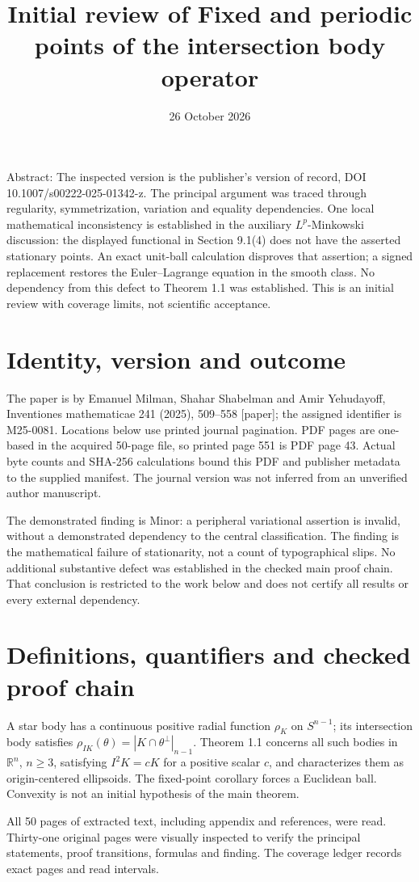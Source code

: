 \documentclass[10pt]{article}
\title{Initial review of
Fixed and periodic points of the intersection body operator}
\author{}
\date{26 October 2026}
\begin{document}
\maketitle
Abstract: The inspected version is the publisher’s version of record, DOI 10.1007/s00222-025-01342-z. The principal argument was traced through regularity, symmetrization, variation and equality dependencies. One local mathematical inconsistency is established in the auxiliary \(L^p\)-Minkowski discussion: the displayed functional in Section 9.1(4) does not have the asserted stationary points. An exact unit-ball calculation disproves that assertion; a signed replacement restores the Euler–Lagrange equation in the smooth class. No dependency from this defect to Theorem 1.1 was established. This is an initial review with coverage limits, not scientific acceptance.\par
\section*{Identity, version and outcome}
The paper is by Emanuel Milman, Shahar Shabelman and Amir Yehudayoff, Inventiones mathematicae 241 (2025), 509–558 [paper]; the assigned identifier is M25-0081. Locations below use printed journal pagination. PDF pages are one-based in the acquired 50-page file, so printed page 551 is PDF page 43. Actual byte counts and SHA-256 calculations bound this PDF and publisher metadata to the supplied manifest. The journal version was not inferred from an unverified author manuscript.\par
The demonstrated finding is Minor: a peripheral variational assertion is invalid, without a demonstrated dependency to the central classification. The finding is the mathematical failure of stationarity, not a count of typographical slips. No additional substantive defect was established in the checked main proof chain. That conclusion is restricted to the work below and does not certify all results or every external dependency.\par
\section*{Definitions, quantifiers and checked proof chain}
A star body has a continuous positive radial function \(\rho_K\) on \(S^{n-1}\); its intersection body satisfies \(\rho_{IK}(\theta)=|K\cap\theta^\perp|_{n-1}\). Theorem 1.1 concerns all such bodies in \(\mathbb R^n\), \(n\geq3\), satisfying \(I^2K=cK\) for a positive scalar \(c\), and characterizes them as origin-centered ellipsoids. The fixed-point corollary forces a Euclidean ball. Convexity is not an initial hypothesis of the main theorem.\par
All 50 pages of extracted text, including appendix and references, were read. Thirty-one original pages were visually inspected to verify the principal statements, proof transitions, formulas and finding. The coverage ledger records exact pages and read intervals.\par
\end{document}
